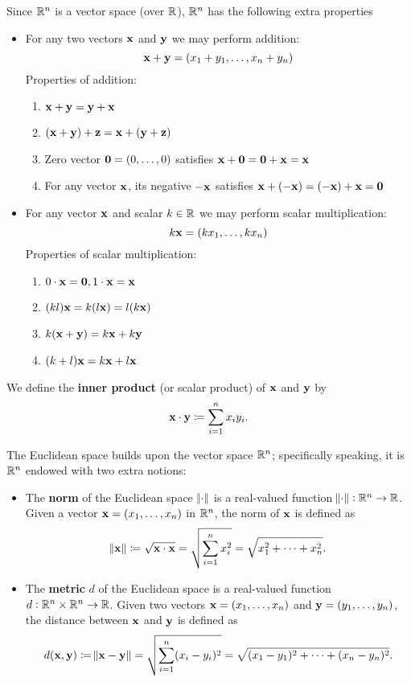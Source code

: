 Since $\mathbb R^n$ is a vector space (over $\mathbb R$), $\mathbb R^n$ has the following extra properties
\begin{itemize}
\item For any two vectors $\vb{x}$ and $\vb{y}$ we may perform addition:
\[ \vb{x}+\vb{y}=(x_1+y_1,\dots,x_n+y_n) \]
Properties of addition:
\begin{enumerate}
\item $\vb{x}+\vb{y}=\vb{y}+\vb{x}$
\item $(\vb{x}+\vb{y})+\vb{z}=\vb{x}+(\vb{y}+\vb{z})$
\item Zero vector $\vb{0}=(0,\dots,0)$ satisfies $\vb{x}+\vb{0}=\vb{0}+\vb{x}=\vb{x}$
\item For any vector $\vb{x}$, its negative $-\vb{x}$ satisfies $\vb{x}+(-\vb{x})=(-\vb{x})+\vb{x}=\vb{0}$
\end{enumerate}
\item For any vector $\vb{x}$ and scalar $k\in\mathbb R$ we may perform scalar multiplication:
\[ k\vb{x}=(kx_1,\dots,kx_n) \]
Properties of scalar multiplication:
\begin{enumerate}
\item $0\cdot\vb{x}=\vb{0},1\cdot\vb{x}=\vb{x}$
\item $(kl)\vb{x}=k(l\vb{x})=l(k\vb{x})$
\item $k(\vb{x}+\vb{y})=k\vb{x}+k\vb{y}$
\item $(k+l)\vb{x}=k\vb{x}+l\vb{x}$
\end{enumerate}
\end{itemize}

We define the \textbf{inner product} (or scalar product) of $\vb{x}$ and $\vb{y}$ by
\[ \vb{x}\cdot\vb{y}\coloneqq\sum_{i=1}^nx_iy_i. \]

The Euclidean space builds upon the vector space $\mathbb R^n$; specifically speaking, it is $\mathbb R^n$ endowed with two extra notions:
\begin{itemize}
\item The \textbf{norm} of the Euclidean space $\norm{\cdot}$ is a real-valued function $\norm{\cdot}:\mathbb R^n\to\mathbb R$. Given a vector $\vb{x}=(x_1,\dots,x_n)$ in $\mathbb R^n$, the norm of $\vb{x}$ is defined as
\[ \norm{\vb{x}}\coloneqq\sqrt{\vb{x}\cdot\vb{x}}=\sqrt{\sum_{i=1}^nx_i^2}=\sqrt{x_1^2+\cdots+x_n^2}. \]
\item The \textbf{metric} $d$ of the Euclidean space is a real-valued function $d:\mathbb R^n\times\mathbb R^n\to\mathbb R$. Given two vectors $\vb{x}=(x_1,\dots,x_n)$ and $\vb{y}=(y_1,\dots,y_n)$, the distance between $\vb{x}$ and $\vb{y}$ is defined as
\[ d(\vb{x},\vb{y})\coloneqq\norm{\vb{x}-\vb{y}}=\sqrt{\sum_{i=1}^n(x_i-y_i)^2}=\sqrt{(x_1-y_1)^2+\cdots+(x_n-y_n)^2}. \]
\end{itemize}

